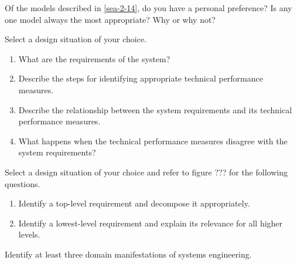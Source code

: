 \begin{exercises}
    \begin{exercise}
    \label{sea-2-14_part2}
        Of the models described in \ref{sea-2-14}, do you have a personal preference? Is any one model always the most appropriate? Why or why not? 
    \end{exercise}
    \begin{solution}
    \end{solution}
    
    \begin{exercise}
    \label{sea-2-15_16}
        Select a design situation of your choice.
        \begin{enumerate}[label=\alph*)]
            \item What are the requirements of the system?
            \item Describe the steps for identifying appropriate technical performance measures.
            \item Describe the relationship between the system requirements and its technical performance measures.
            \item What happens when the technical performance measures disagree with the system requirements?
        \end{enumerate}
    \end{exercise}
    \begin{solution}
    \end{solution}
    
    \begin{exercise}
    \label{sea-2-18_20}
        Select a design situation of your choice and refer to figure ??? for the following questions.
        \begin{enumerate}[label=\alph*)]
            \item Identify a top-level requirement and decompose it appropriately.
            \item Identify a lowest-level requirement and explain its relevance for all higher levels.
        \end{enumerate}
    \end{exercise}
    \begin{solution}
    \end{solution}
    
    \begin{exercise}
    \label{sea-2-22}
        Identify at least three domain manifestations of systems engineering.  
    \end{exercise}
    \begin{solution}
    \end{solution}
    

\end{exercises}
